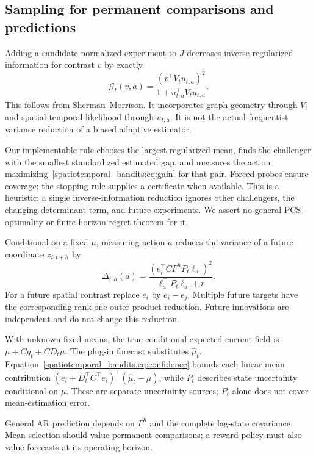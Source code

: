 \subsection{Sampling for permanent comparisons and predictions}
Adding a candidate normalized experiment to $J$ decreases inverse regularized information for contrast $v$ by exactly
\begin{equation}
\boxed{\mathcal G_t(v,a)=
\frac{(v^\top V_tu_{t,a})^2}{1+u_{t,a}^\top V_tu_{t,a}}.}
\label{spatiotemporal_bandits:eq:gain}
\end{equation}
This follows from Sherman--Morrison. It incorporates graph geometry through $V_t$ and spatial-temporal likelihood through $u_{t,a}$. It is not the actual frequentist variance reduction of a biased adaptive estimator.

Our implementable rule chooses the largest regularized mean, finds the challenger with the smallest standardized estimated gap, and measures the action maximizing~\eqref{spatiotemporal_bandits:eq:gain} for that pair. Forced probes ensure coverage; the stopping rule supplies a certificate when available. This is a heuristic: a single inverse-information reduction ignores other challengers, the changing determinant term, and future experiments. We assert no general PCS-optimality or finite-horizon regret theorem for it.

Conditional on a fixed $\mu$, measuring action $a$ reduces the variance of a future coordinate $z_{i,t+h}$ by
\begin{equation}
\boxed{\Delta_{i,h}(a)=
\frac{(e_i^\top CF^hP_t\ell_a)^2}{\ell_a^\top P_t\ell_a+r}.}
\label{spatiotemporal_bandits:eq:prediction-gain}
\end{equation}
For a future spatial contrast replace $e_i$ by $e_i-e_j$. Multiple future targets have the corresponding rank-one outer-product reduction. Future innovations are independent and do not change this reduction.

With unknown fixed means, the true conditional expected current field is $\mu+Cg_t+CD_t\mu$. The plug-in forecast substitutes $\widehat\mu_t$. Equation~\eqref{spatiotemporal_bandits:eq:confidence} bounds each linear mean contribution $(e_i+D_t^\top C^\top e_i)^\top(\widehat\mu_t-\mu)$, while $P_t$ describes state uncertainty conditional on $\mu$. These are separate uncertainty sources; $P_t$ alone does not cover mean-estimation error.

General AR prediction depends on $F^h$ and the complete lag-state covariance. Mean selection should value permanent comparisons; a reward policy must also value forecasts at its operating horizon.


